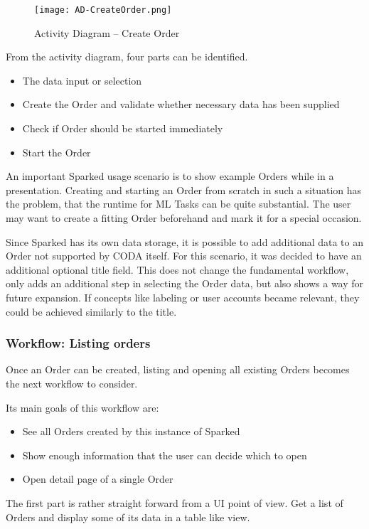 \begin{figure}
	\texttt{[image: AD-CreateOrder.png]}
	\caption{Activity Diagram – Create Order}
\end{figure}

From the activity diagram, four parts can be identified. 
\begin{itemize} 
\item The data input or selection
\item Create the Order and validate whether necessary data has been supplied
\item Check if Order should be started immediately
\item Start the Order
\end{itemize}

An important Sparked usage scenario is to show example Orders while in a presentation. Creating and starting an Order from scratch in such a situation has the problem, that the runtime for ML Tasks can be quite substantial. The user may want to create a fitting Order beforehand and mark it for a special occasion.

Since Sparked has its own data storage, it is possible to add additional data to an Order not supported by CODA itself. For this scenario, it was decided to have an additional optional title field. This does not change the fundamental workflow, only adds an additional step in selecting the Order data, but also shows a way for future expansion. If concepts like labeling or user accounts became relevant, they could be achieved similarly to the title.

\subsubsection{Workflow: Listing orders}
Once an Order can be created, listing and opening all existing Orders becomes the next workflow to consider. 

Its main goals of this workflow are:

\begin{itemize}
\item See all Orders created by this instance of Sparked
\item Show enough information that the user can decide which to open
\item Open detail page of a single Order

\end{itemize}

The first part is rather straight forward from a UI point of view. Get a list of Orders and display some of its data in a table like view. 

